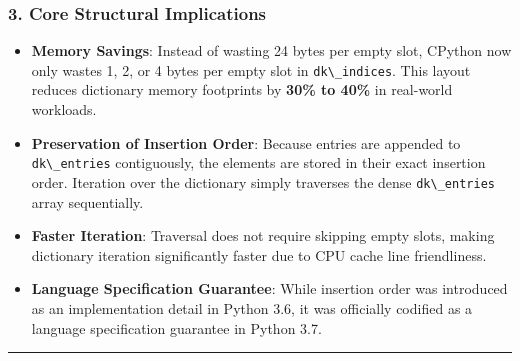 \hypertarget{core-structural-implications}{%
\subsubsection{3. Core Structural
Implications}\label{core-structural-implications}}

\begin{itemize}
\tightlist
\item
  \textbf{Memory Savings}: Instead of wasting 24 bytes per empty slot,
  CPython now only wastes 1, 2, or 4 bytes per empty slot in
  \passthrough{\lstinline!dk\_indices!}. This layout reduces dictionary
  memory footprints by \textbf{30\% to 40\%} in real-world workloads.
\item
  \textbf{Preservation of Insertion Order}: Because entries are appended
  to \passthrough{\lstinline!dk\_entries!} contiguously, the elements
  are stored in their exact insertion order. Iteration over the
  dictionary simply traverses the dense
  \passthrough{\lstinline!dk\_entries!} array sequentially.
\item
  \textbf{Faster Iteration}: Traversal does not require skipping empty
  slots, making dictionary iteration significantly faster due to CPU
  cache line friendliness.
\item
  \textbf{Language Specification Guarantee}: While insertion order was
  introduced as an implementation detail in Python 3.6, it was
  officially codified as a language specification guarantee in Python
  3.7.
\end{itemize}

\begin{center}\rule{0.5\linewidth}{0.5pt}\end{center}
